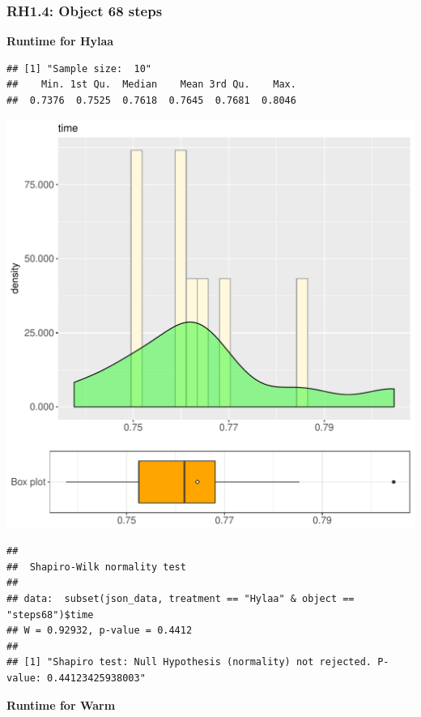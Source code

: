 \documentclass{article}\usepackage[]{graphicx}\usepackage[]{color}
\makeatletter
\def\maxwidth{ %
  \ifdim\Gin@nat@width>\linewidth
    \linewidth
  \else
    \Gin@nat@width
  \fi
}
\newenvironment{kframe}{%
 \def\at@end@of@kframe{}%
 \ifinner\ifhmode%
  \def\at@end@of@kframe{\end{minipage}}%
  \begin{minipage}{\columnwidth}%
 \fi\fi%
 \def\FrameCommand##1{\hskip\@totalleftmargin \hskip-\fboxsep
 \colorbox{shadecolor}{##1}\hskip-\fboxsep
     \hskip-\linewidth \hskip-\@totalleftmargin \hskip\columnwidth}%
 \MakeFramed {\advance\hsize-\width
   \@totalleftmargin\z@ \linewidth\hsize
   \@setminipage}}%
 {\par\unskip\endMakeFramed%
 \at@end@of@kframe}
\newenvironment{knitrout}{}{} %
\makeatother
\begin{document}
\subsubsection{RH1.4: Object 68 steps}

 \textbf{Runtime for Hylaa}
\begin{knitrout}
\color{fgcolor}\begin{kframe}
\begin{verbatim}
## [1] "Sample size:  10"
##    Min. 1st Qu.  Median    Mean 3rd Qu.    Max. 
##  0.7376  0.7525  0.7618  0.7645  0.7681  0.8046
\end{verbatim}
\end{kframe}
\includegraphics[width=\maxwidth]{figure/RH1_Hylaa_steps68-1} 
\begin{kframe}\begin{verbatim}
## 
## 	Shapiro-Wilk normality test
## 
## data:  subset(json_data, treatment == "Hylaa" & object == "steps68")$time
## W = 0.92932, p-value = 0.4412
## 
## [1] "Shapiro test: Null Hypothesis (normality) not rejected. P-value: 0.44123425938003"
\end{verbatim}
\end{kframe}
\end{knitrout}
 \textbf{Runtime for Warm}
\end{document}
